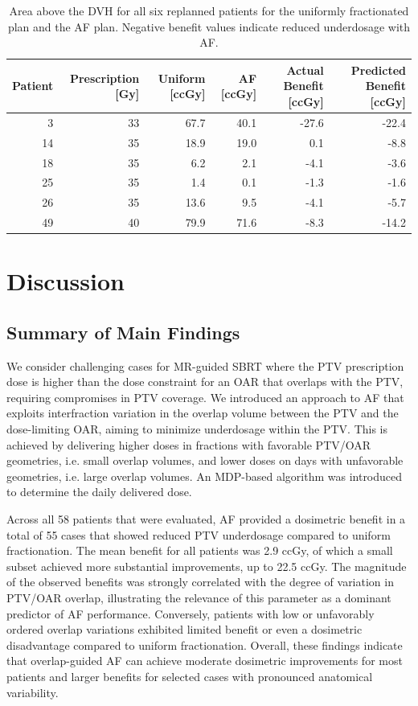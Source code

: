 \documentclass[11pt]{article}
\newcommand{\toprule}{\hline}
\newcommand{\midrule}{\hline}
\newcommand{\bottomrule}{\hline}
\begin{document}
\begin{table}[ht]
\centering
\caption{Area above the DVH for all six replanned patients for the uniformly fractionated plan and the AF plan. Negative benefit values indicate reduced underdosage with AF.}
\label{tab:all-replanned-2025}
\begin{tabular}{rrrrrr}
\toprule
Patient & Prescription [Gy] & Uniform [ccGy] & AF [ccGy] & Actual Benefit [ccGy] & Predicted Benefit [ccGy] \\
\midrule
3 & 33 & 67.7 & 40.1 & -27.6 & -22.4 \\
14 & 35 & 18.9 & 19.0 & 0.1 & -8.8 \\
18 & 35 & 6.2 & 2.1 & -4.1 & -3.6 \\
25 & 35 & 1.4 & 0.1 & -1.3 & -1.6 \\
26 & 35 & 13.6 & 9.5 & -4.1 & -5.7 \\
49 & 40 & 79.9 & 71.6 & -8.3 & -14.2 \\
\bottomrule
\end{tabular}
\end{table}

\section{Discussion}

\subsection{Summary of Main Findings}

We consider challenging cases for MR-guided SBRT where the PTV prescription dose is higher than the dose constraint for an OAR that overlaps with the PTV, requiring compromises in PTV coverage. We introduced an approach to AF that exploits interfraction variation in the overlap volume between the PTV and the dose-limiting OAR, aiming to minimize underdosage within the PTV. This is achieved by delivering higher doses in fractions with favorable PTV/OAR geometries, i.e. small overlap volumes, and lower doses on days with unfavorable geometries, i.e. large overlap volumes. An MDP-based algorithm was introduced to determine the daily delivered dose.

Across all 58 patients that were evaluated, AF provided a dosimetric benefit in a total of 55 cases that showed reduced PTV underdosage compared to uniform fractionation. The mean benefit for all patients was 2.9 ccGy, of which a small subset achieved more substantial improvements, up to 22.5 ccGy. The magnitude of the observed benefits was strongly correlated with the degree of variation in PTV/OAR overlap, illustrating the relevance of this parameter as a dominant predictor of AF performance. Conversely, patients with low or unfavorably ordered overlap variations exhibited limited benefit or even a dosimetric disadvantage compared to uniform fractionation. Overall, these findings indicate that overlap-guided AF can achieve moderate dosimetric improvements for most patients and larger benefits for selected cases with pronounced anatomical variability.
\end{document}
